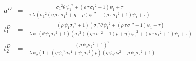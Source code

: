 \documentclass[12pt,letterpaper]{article}
\begin{document}
%
%
\begin{eqnarray*}
a^D&=&{\frac {{\sigma_{{1}}}^{2}\theta\,{\psi_{{1}}}^{2}+ \left( \rho\,\tau
\,{\sigma_{{1}}}^{2}+1 \right) \psi_{{1}}+\tau}{\tau\,\lambda\,
 \left( {\sigma_{{1}}}^{2} \left( \eta\,\rho\,\tau\,{\sigma_{{1}}}^{2}
+\eta+\rho \right) {\psi_{{1}}}^{2}+ \left( \rho\,\tau\,{\sigma_{{1}}}
^{2}+1 \right) \psi_{{1}}+\tau \right) }}\\
t_1^D&=&{\frac { \left( \rho\,\psi_{{1}}{\sigma_{{1}}}^{2}+1 \right)  \left( {
\sigma_{{1}}}^{2}\theta\,{\psi_{{1}}}^{2}+ \left( \rho\,\tau\,{\sigma_
{{1}}}^{2}+1 \right) \psi_{{1}}+\tau \right) }{\lambda\,\psi_{{1}}
 \left( \theta\,\psi_{{1}}{\sigma_{{1}}}^{2}+1 \right)  \left( {\sigma
_{{1}}}^{2} \left(  \left( \eta\,\tau\,{\sigma_{{1}}}^{2}+1 \right)
\rho+\eta \right) {\psi_{{1}}}^{2}+ \left( \rho\,\tau\,{\sigma_{{1}}}^
{2}+1 \right) \psi_{{1}}+\tau \right) }}\\
t_2^D&=& {\frac { \left( \rho\,\psi_{{2}}{\sigma_{{2}}}^{2}+1 \right) ^{2}}{
\lambda\,\psi_{{2}} \left( 1+ \left( \eta\,{\psi_{{2}}}^{2}{\sigma_{{2
}}}^{4}+\psi_{{2}}{\sigma_{{2}}}^{2} \right) \rho \right)  \left( \eta
\,\psi_{{2}}{\sigma_{{2}}}^{2}+\rho\,\psi_{{2}}{\sigma_{{2}}}^{2}+1
 \right) }}
\end{eqnarray*}
\end{document}
